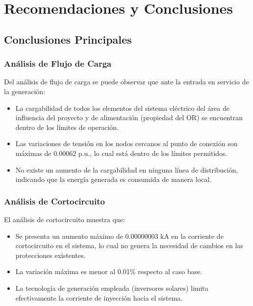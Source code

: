\chapter{Recomendaciones y Conclusiones}

\section{Conclusiones Principales}

\subsection{Análisis de Flujo de Carga}

Del análisis de flujo de carga se puede observar que ante la entrada en servicio de la generación:

\begin{itemize}
    \item La cargabilidad de todos los elementos del sistema eléctrico del área de influencia del proyecto y de alimentación (propiedad del OR) se encuentran dentro de los límites de operación.
    
    \item Las variaciones de tensión en los nodos cercanos al punto de conexión son máximas de 0.00062 p.u., lo cual está dentro de los límites permitidos.
    
    \item No existe un aumento de la cargabilidad en ninguna línea de distribución, indicando que la energía generada es consumida de manera local.
\end{itemize}

\subsection{Análisis de Cortocircuito}

El análisis de cortocircuito muestra que:

\begin{itemize}
    \item Se presenta un aumento máximo de 0.00000003 kA en la corriente de cortocircuito en el sistema, lo cual no genera la necesidad de cambios en las protecciones existentes.
    
    \item La variación máxima es menor al 0.01\% respecto al caso base.
    
    \item La tecnología de generación empleada (inversores solares) limita efectivamente la corriente de inyección hacia el sistema.
\end{itemize}

